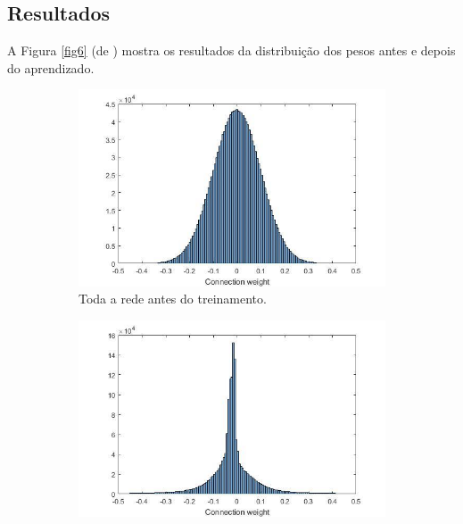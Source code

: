 \documentclass{article}
\begin{document}
        \subsection{Resultados}

            A Figura \ref{fig6} (de \cite{testolin2018deep}) mostra os resultados da distribuição dos pesos antes e depois do aprendizado.

            \begin{figure}[h!]
                \begin{subfigure}{0.5\textwidth}
                    \centering
                    \includegraphics[scale=.3]{Images/Weights distribution.png}
                    \caption{Toda a rede antes do treinamento.}
                \end{subfigure}
                \begin{subfigure}{0.5\textwidth}
                    \centering
                    \includegraphics[scale=0.3]{Images/Weights distribution (2).png}

\end{subfigure}
\end{figure}
\end{document}
